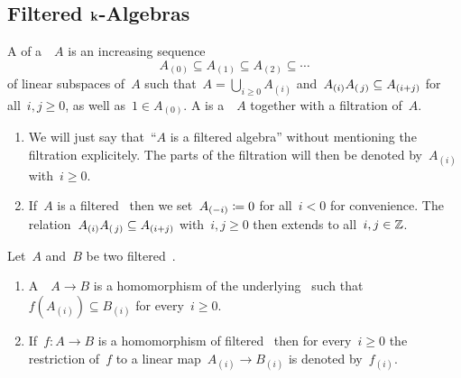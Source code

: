 \subsection{Filtered \texorpdfstring{$\kf$}{k}-Algebras}


\begin{definition}
  A  of a~\algebra{$\kf$}~$A$ is an increasing sequence
  \[
    A_{(0)}
    \subseteq
    A_{(1)}
    \subseteq
    A_{(2)}
    \subseteq
    \dotsb
  \]
  of linear subspaces of~$A$ such that~$A = \bigcup_{i \geq 0} A_{(i)}$ and~$A_{(i)} A_{(\, j)} \subseteq A_{(i+j)}$ for all~$i,j \geq 0$, as well as~$1 \in A_{(0)}$.
  A  is a~\algebra{$\kf$}~$A$ together with a filtration of~$A$.
\end{definition}


\begin{remark}
  \label{filtration conventions}
  \leavevmode
  \begin{enumerate}
    \item
      We will just say that~\enquote{$A$ is a filtered algebra} without mentioning the filtration explicitely.
      The parts of the filtration will then be denoted by~$A_{(i)}$ with~$i \geq 0$.
    \item
      If~$A$ is a filtered~{\algebra{$\kf$}} then we set~$A_{(-i)} \coloneqq 0$ for all~$i < 0$ for convenience.
      The relation~$A_{(i)} A_{(\, j)} \subseteq A_{(i+j)}$ with~$i,j \geq 0$ then extends to all~$i, j \in \mathbb{Z}$.
  \end{enumerate}
\end{remark}


\begin{definition}
  Let~$A$ and~$B$ be two filtered~\algebras{$\kf$}.
  \begin{enumerate}
    \item
      A~~$A \to B$ is a homomorphism of the underlying~{\algebras{$\kf$}} such that~$f(A_{(i)}) \subseteq B_{(i)}$ for every~$i \geq 0$.
    \item
      If~$f \colon A \to B$ is a homomorphism of filtered~{\algebras{$\kf$}} then for every~$i \geq 0$ the restriction of~$f$ to a linear map~$A_{(i)} \to B_{(i)}$ is denoted by~$f_{(i)}$.
  \end{enumerate}
\end{definition}


